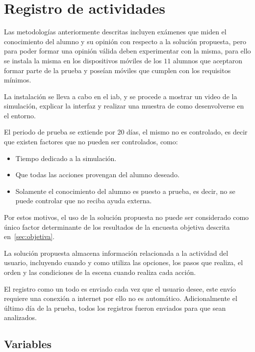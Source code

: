 \section{Registro de actividades}
\label{sec:registro}

Las metodologías anteriormente descritas incluyen exámenes que miden
el conocimiento del alumno y su opinión con respecto a la solución propuesta,
pero para poder formar una opinión válida deben experimentar con la misma, para
ello se instala la misma en los dispositivos móviles de los $11$ alumnos que
aceptaron formar parte de la prueba y poseían móviles que cumplen con los requisitos
mínimos.

La instalación se lleva a cabo en el \Gls{iab}, y se procede a mostrar un video
de la simulación, explicar la interfaz y realizar una muestra de como
desenvolverse en el entorno.

El periodo de prueba se extiende por 20 días, el mismo no es controlado, es
decir que existen factores que no pueden ser controlados, como:

\begin{itemize}
    \item Tiempo dedicado a la simulación.
    \item Que todas las acciones provengan del alumno deseado.
    \item Solamente el conocimiento del alumno es puesto a prueba, es decir, no
        se puede controlar que no reciba ayuda externa.
\end{itemize}


Por estos motivos, el uso de la solución propuesta no puede ser considerado
como único factor determinante de los resultados de la encuesta objetiva
descrita en~\ref{sec:objetiva}.

La solución propuesta almacena información relacionada a la actividad del
usuario, incluyendo cuando y como utiliza las opciones, los pasos que realiza,
el orden y las condiciones de la escena cuando realiza cada acción.

El registro como un todo es enviado cada vez que el usuario desee, este envío
requiere una conexión a internet por ello no es automático. Adicionalmente el
último día de la prueba, todos los registros fueron enviados para que sean
analizados.


\subsection{Variables}

